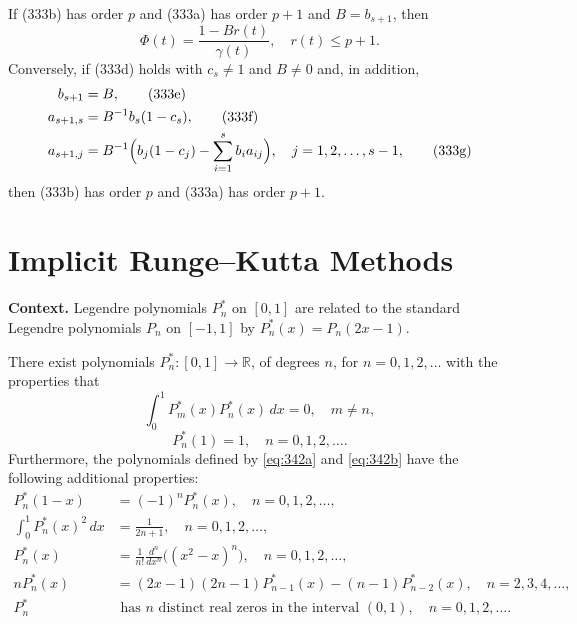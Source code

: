 \begin{theorem}

  \label{thm:333A}
If (333b) has order $p$ and (333a) has order $p+1$ and $B = b_{s+1}$, then
\[
\Phi(t) = \frac{1 - B r(t)}{\gamma(t)}, \quad r(t) \leq p+1. \tag{333d}
\]
Conversely, if (333d) holds with $c_s \neq 1$ and $B \neq 0$ and, in addition,
\begin{align}
b_{s+1} &= B, \tag{333e}\\
a_{s+1,s} &= B^{-1} b_s (1 - c_s), \tag{333f}\\
a_{s+1,j} &= B^{-1} \Bigl( b_j (1 - c_j) - \sum_{i=1}^{s} b_i a_{ij} \Bigr), \quad j = 1,2,\dots,s-1, \tag{333g}
\end{align}
then (333b) has order $p$ and (333a) has order $p+1$.
\end{theorem}

\section{Implicit Runge–Kutta Methods}

\noindent\textbf{Context.}
Legendre polynomials $P_n^*$ on $[0,1]$ are related to the standard Legendre polynomials $P_n$ on $[-1,1]$ by $P_n^*(x)=P_n(2x-1)$.

\begin{lemma}

  \label{lem:342A}
There exist polynomials \(P_n^* : [0, 1] \to \mathbb{R}\), of degrees \(n\), for \(n = 0, 1, 2, \dots\) with the properties that
\[
\int_0^1 P_m^*(x) P_n^*(x) \, dx = 0, \quad m \neq n, \tag{342a}
\]
\[
P_n^*(1) = 1, \quad n = 0, 1, 2, \dots. \tag{342b}
\]
Furthermore, the polynomials defined by \eqref{eq:342a} and \eqref{eq:342b} have the following additional properties:
\begin{align}
P_n^*(1 - x) &= (-1)^n P_n^*(x), \quad n = 0, 1, 2, \dots, \tag{342c} \\
\int_0^1 P_n^*(x)^2 \, dx &= \frac{1}{2n + 1}, \quad n = 0, 1, 2, \dots, \tag{342d} \\
P_n^*(x) &= \frac{1}{n!} \frac{d^n}{dx^n} \bigl( (x^2 - x)^n \bigr), \quad n = 0, 1, 2, \dots, \tag{342e} \\
n P_n^*(x) &= (2x - 1)(2n - 1) P_{n-1}^*(x) - (n - 1) P_{n-2}^*(x), \quad n = 2, 3, 4, \dots, \tag{342f} \\
P_n^* &\text{ has } n \text{ distinct real zeros in the interval } (0, 1), \quad n = 0, 1, 2, \dots. \tag{342g}
\end{align}
\end{lemma}


